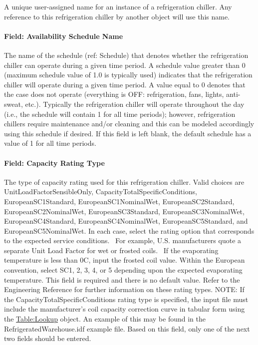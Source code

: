 A unique user-assigned name for an instance of a refrigeration chiller. Any reference to this refrigeration chiller by another object will use this name.

\paragraph{Field: Availability Schedule Name}\label{field-availability-schedule-name-2-007}

The name of the schedule (ref: Schedule) that denotes whether the refrigeration chiller can operate during a given time period. A schedule value greater than 0 (maximum schedule value of 1.0 is typically used) indicates that the refrigeration chiller will operate during a given time period. A value equal to 0 denotes that the case does not operate (everything is OFF: refrigeration, fans, lights, anti-sweat, etc.). Typically the refrigeration chiller will operate throughout the day (i.e., the schedule will contain 1 for all time periods); however, refrigeration chillers require maintenance and/or cleaning and this can be modeled accordingly using this schedule if desired. If this field is left blank, the default schedule has a value of 1 for all time periods.

\paragraph{Field: Capacity Rating Type}\label{field-capacity-rating-type}

The type of capacity rating used for this refrigeration chiller. Valid choices are UnitLoadFactorSensibleOnly, CapacityTotalSpecificConditions, EuropeanSC1Standard, EuropeanSC1NominalWet, EuropeanSC2Standard, EuropeanSC2NominalWet, EuropeanSC3Standard, EuropeanSC3NominalWet, EuropeanSC4Standard, EuropeanSC4NominalWet, EuropeanSC5Standard, and EuropeanSC5NominalWet. In each case, select the rating option that corresponds to the expected service conditions.~ For example, U.S. manufacturers quote a separate Unit Load Factor for wet or frosted coils.~ If the evaporating temperature is less than 0C, input the frosted coil value. Within the European convention, select SC1, 2, 3, 4, or 5 depending upon the expected evaporating temperature. This field is required and there is no default value. Refer to the Engineering Reference for further information on these rating types. NOTE: If the CapacityTotalSpecificConditions rating type is specified, the input file must include the manufacturer's coil capacity correction curve in tabular form using the \hyperref[tablelookup]{Table:Lookup} object. An example of this may be found in the RefrigeratedWarehouse.idf example file. Based on this field, only one of the next two fields should be entered.

